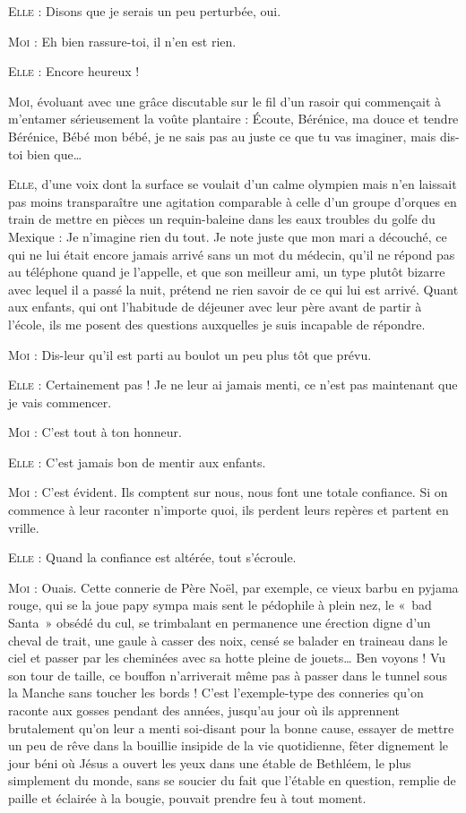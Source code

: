 \begin{dialogue}
\textsc{Elle} : Disons que je serais un peu perturbée, oui.

\textsc{Moi} : Eh bien rassure-toi, il n’en est rien.

\textsc{Elle} : Encore heureux !

\textsc{Moi}, évoluant avec une grâce discutable sur le fil d’un rasoir qui commençait à m’entamer sérieusement la voûte plantaire : Écoute, Bérénice, ma douce et tendre Bérénice, Bébé mon bébé, je ne sais pas au juste ce que tu vas imaginer, mais dis-toi bien que…

%

\textsc{Elle}, d’une voix dont la surface se voulait d’un calme olympien mais n’en laissait pas moins transparaître une agitation comparable à celle d’un groupe d’orques en train de mettre en pièces un requin-baleine dans les eaux troubles du golfe du Mexique : Je n’imagine rien du tout. Je note juste que mon mari a découché, ce qui ne lui était encore jamais arrivé sans un mot du médecin, qu’il ne répond pas au téléphone quand je l’appelle, et que son meilleur ami, un type plutôt bizarre avec lequel il a passé la nuit, prétend ne rien savoir de ce qui lui est arrivé. Quant aux enfants, qui ont l’habitude de déjeuner avec leur père avant de partir à l’école, ils me posent des questions auxquelles je suis incapable de répondre.

\textsc{Moi} : Dis-leur qu’il est parti au boulot un peu plus tôt que prévu.

\textsc{Elle} : Certainement pas ! Je ne leur ai jamais menti, ce n’est pas maintenant que je vais commencer.

\textsc{Moi} : C’est tout à ton honneur.

\textsc{Elle} : C’est jamais bon de mentir aux enfants.

\textsc{Moi} : C’est évident. Ils comptent sur nous, nous font une totale confiance. Si on commence à leur raconter n’importe quoi, ils perdent leurs repères et partent en vrille.

\textsc{Elle} : Quand la confiance est altérée, tout s’écroule.

\textsc{Moi} : Ouais. Cette connerie de Père Noël, par exemple, ce vieux barbu en pyjama rouge, qui se la joue papy sympa mais sent le pédophile à plein nez, le «~bad Santa~» obsédé du cul, se trimbalant en permanence une érection digne d’un cheval de trait, une gaule à casser des noix, censé se balader en traineau dans le ciel et passer par les cheminées avec sa hotte pleine de jouets… Ben voyons ! Vu son tour de taille, ce bouffon n’arriverait même pas à passer dans le tunnel sous la Manche sans toucher les bords ! C’est l’exemple-type des conneries qu’on raconte aux gosses pendant des années, jusqu’au jour où ils apprennent brutalement qu’on leur a menti soi-disant pour la bonne cause, essayer de mettre un peu de rêve dans la bouillie insipide de la vie quotidienne, fêter dignement le jour béni où Jésus a ouvert les yeux dans une étable de Bethléem, le plus simplement du monde, sans se soucier du fait que l’étable en question, remplie de paille et éclairée à la bougie, pouvait prendre feu à tout moment.


\end{dialogue}
